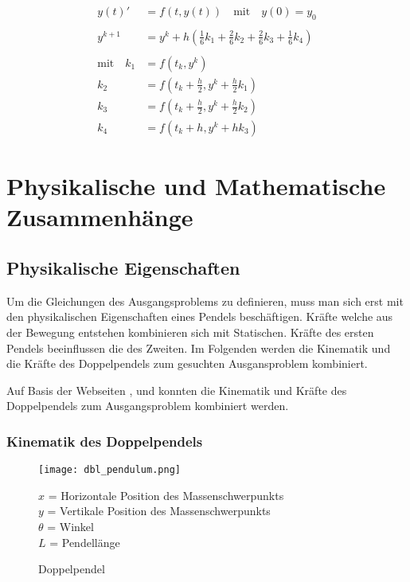 \documentclass[12pt]{article}
\numberwithin{equation}{subsection}
\begin{document}
\begin{align} \label{algo:rk}
	y(t)' &= f(t,y(t)) \quad \text{mit} \quad y(0) = y_0 \nonumber\\
	\nonumber\\
	y^{k+1} &= y^k + h \left(\frac{1}{6}k_1 + \frac{2}{6}k_2 + \frac{2}{6}k_3 + \frac{1}{6}k_4 \right)\\
	\nonumber\\
	\text{mit} \quad k_1 &= f(t_k, y^k) \nonumber\\
	k_2 &= f\left(t_k + \frac{h}{2}, y^k + \frac{h}{2}k_1 \right) \nonumber\\
	k_3 &= f\left(t_k + \frac{h}{2}, y^k + \frac{h}{2}k_2 \right) \nonumber\\
	k_4 &= f\left(t_k + h, y^k + h k_3 \right)\nonumber
\end{align}

\newpage
\section{Physikalische und Mathematische Zusammenhänge}
\subsection{Physikalische Eigenschaften}
Um die Gleichungen des Ausgangsproblems zu definieren, muss man sich erst mit den physikalischen Eigenschaften eines Pendels beschäftigen. Kräfte welche aus der Bewegung entstehen kombinieren sich mit Statischen. Kräfte des ersten Pendels beeinflussen die des Zweiten. Im Folgenden werden die Kinematik und die Kräfte des Doppelpendels zum gesuchten Ausgansproblem kombiniert.

Auf Basis der Webseiten \citep{neumann04a}, \citep{kramann11} und \citep{weissstein07} konnten die Kinematik und Kräfte des Doppelpendels zum Ausgangsproblem kombiniert werden. 

\subsubsection{Kinematik des Doppelpendels}
\begin{figure}[H]
	\begin{minipage}[!b]{0.4\textwidth}
		\centering
		\texttt{[image: dbl\_pendulum.png]}
		\caption[Doppelpendel]{Doppelpendel \citep{neumann04a}}
		\label{fig:energy}
	\end{minipage}
	\begin{minipage}[!t]{\textwidth}
		\vspace{0pt}\raggedright
		$x$ = Horizontale Position des Massenschwerpunkts\\
		$y$ = Vertikale Position des Massenschwerpunkts\\
		$\theta$ = Winkel\\
		$L$ = Pendellänge
	\end{minipage}
\end{figure}
\end{document}
